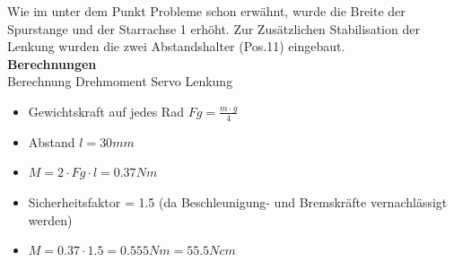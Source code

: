 Wie im unter dem Punkt Probleme schon erwähnt, wurde die Breite der Spurstange und der Starrachse 1 erhöht. Zur Zusätzlichen Stabilisation der Lenkung wurden die zwei Abstandshalter (Pos.11) eingebaut.\\[0.2cm]
\textbf{Berechnungen}\\[0.2cm]
Berechnung Drehmoment Servo Lenkung
\begin{itemize}
\item Gewichtskraft auf jedes Rad $Fg = \frac{m\cdot g}{4}$
\item Abstand $l = 30mm$
\item $M = 2\cdot Fg\cdot l = 0.37Nm$
\item Sicherheitsfaktor = 1.5 (da Beschleunigung- und Bremskräfte vernachlässigt werden)
\item $M = 0.37\cdot 1.5 = 0.555Nm = 55.5Ncm$
\end{itemize}